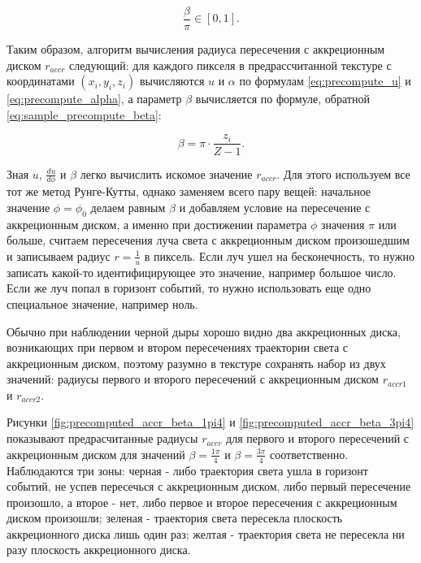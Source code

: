 \begin{equation}
\label{eq:sample_precompute_beta}
    \frac{\beta}{\pi} \in \left[0, 1\right].
\end{equation}

Таким образом, алгоритм вычисления радиуса пересечения с аккреционным диском $r_{accr}$ следующий: для каждого пикселя в предрассчитанной текстуре с координатами $(x_i, y_i, z_i)$ вычисляются $u$ и $\alpha$ по формулам \eqref{eq:precompute_u} и \eqref{eq:precompute_alpha}, а параметр $\beta$ вычисляется по формуле, обратной \eqref{eq:sample_precompute_beta}:

\begin{equation}
\label{eq:precompute_beta}
    \beta = \pi \cdot \frac{z_i}{Z - 1}.
\end{equation}

Зная $u$, $\frac{du}{d\phi}$ и $\beta$ легко вычислить искомое значение $r_{accr}$. Для этого используем все тот же метод Рунге-Кутты, однако заменяем всего пару вещей: начальное значение $\phi=\phi_0$ делаем равным $\beta$ и добавляем условие на пересечение с аккреционным диском, а именно при достижении параметра $\phi$ значения $\pi$ или больше, считаем пересечения луча света с аккреционным диском произошедшим и записываем радиус $r = \frac{1}{u}$ в пиксель. Если луч ушел на бесконечность, то нужно записать какой-то идентифицирующее это значение, например большое число. Если же луч попал в горизонт событий, то нужно использовать еще одно специальное значение, например ноль.

Обычно при наблюдении черной дыры хорошо видно два аккреционных диска, возникающих при первом и втором пересечениях траектории света с аккреционным диском, поэтому разумно в текстуре сохранять набор из двух значений: радиусы первого и второго пересечений с аккреционным диском $r_{accr1}$ и $r_{accr2}$.

Рисунки \ref{fig:precomputed_accr_beta_1pi4} и \ref{fig:precomputed_accr_beta_3pi4} показывают предрасчитанные радиусы $r_{accr}$ для первого и второго пересечений с аккреционным диском для значений $\beta = \frac{1\pi}{4}$ и $\beta = \frac{3\pi}{4}$ соответственно. Наблюдаются три зоны: черная - либо траектория света ушла в горизонт событий, не успев пересечься с аккреционным диском, либо первый пересечение произошло, а второе - нет, либо первое и второе пересечения с аккреционным диском произошли; зеленая - траектория света пересекла плоскость аккреционного диска лишь один раз; желтая - траектория света не пересекла ни разу плоскость аккреционного диска.

